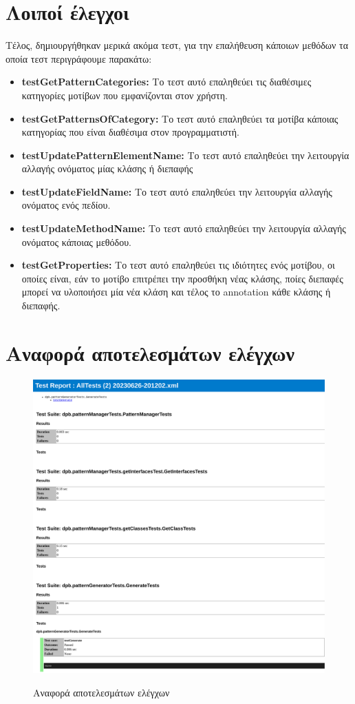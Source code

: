 \section{Λοιποί έλεγχοι}
\label{sec:moreTests}
Τέλος, δημιουργήθηκαν μερικά ακόμα τεστ, για την επαλήθευση κάποιων μεθόδων τα οποία τεστ περιγράφουμε παρακάτω:
\begin{itemize}
    \item \textbf{testGetPatternCategories:} Το τεστ αυτό επαληθεύει τις διαθέσιμες κατηγορίες μοτίβων που εμφανίζονται στον χρήστη.
    \item \textbf{testGetPatternsOfCategory:} Το τεστ αυτό επαληθεύει τα μοτίβα κάποιας κατηγορίας που είναι διαθέσιμα 
    στον προγραμματιστή.
    \item \textbf{testUpdatePatternElementName:} Το τεστ αυτό επαληθεύει την λειτουργία αλλαγής ονόματος μίας κλάσης ή διεπαφής
    \item \textbf{testUpdateFieldName:} Το τεστ αυτό επαληθεύει την λειτουργία αλλαγής ονόματος ενός πεδίου.
    \item \textbf{testUpdateMethodName:} Το τεστ αυτό επαληθεύει την λειτουργία αλλαγής ονόματος κάποιας μεθόδου.
    \item \textbf{testGetProperties:} Το τεστ αυτό επαληθεύει τις ιδιότητες ενός μοτίβου, οι οποίες είναι, 
    εάν το μοτίβο επιτρέπει την προσθήκη νέας κλάσης, 
    ποίες διεπαφές μπορεί να υλοποιήσει μία νέα κλάση και τέλος το annotation κάθε κλάσης ή διεπαφής.
\end{itemize}
\section{Αναφορά αποτελεσμάτων ελέγχων}
\label{sec:testReport}
\begin{figure}[H]
    \includegraphics[width=1.0\textwidth]{Figures/test_report.png}
    \label{fig:testReport}
    \caption{Αναφορά αποτελεσμάτων ελέγχων}
\end{figure}